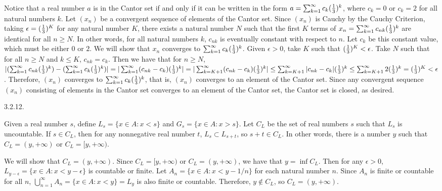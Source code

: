 Notice that a real number $a$ is in the Cantor set
if and only if it can be written in the form
$a = \sum _{k=1} ^\infty c_k ({1 \over 3})^k$,
where $c_k = 0$ or $c_k = 2$ for all natural numbers $k$.
Let $(x_n)$ be a convergent sequence of elements of the Cantor set.
Since $(x_n)$ is Cauchy by the Cauchy Criterion,
taking $\epsilon = ({1 \over 3})^K$ for any natural number $K$,
there exists a natural number $N$ such that the first $K$ terms of
$x_n = \sum _{k=1} ^\infty c_{nk} ({1 \over 3})^k$
are identical for all $n \ge N$.
In other words, for all natural numbers $k$, $c_{nk}$
is eventually constant with respect to $n$.
Let $c_k$ be this constant value, which must be either $0$ or $2$.
We will show that $x_n$ converges to $\sum _{k=1} ^\infty c_k ({1 \over 3})^k$.
Given $\epsilon > 0$, take $K$ such that $({1 \over 3})^K < \epsilon$.
Take $N$ such that for all $n \ge N$ and $k \le K$, $c_{nk} = c_k$.
Then we have that for $n \ge N$,
$\vert(\sum _{k=1} ^\infty c_{nk} ({1 \over 3})^k) -
(\sum _{k=1} ^\infty c_k ({1 \over 3})^k)\vert =
\vert\sum _{k=1} ^\infty (c_{nk} - c_k) ({1 \over 3})^k\vert =
\vert\sum _{k=K+1} ^\infty (c_{nk} - c_k) ({1 \over 3})^k\vert \le
\sum _{k=K+1} ^\infty \vert c_{nk} - c_k\vert ({1 \over 3})^k \le
\sum _{k=K+1} ^\infty 2 ({1 \over 3})^k = ({1 \over 3})^K < \epsilon$.
Therefore, $(x_n)$ converges to $\sum _{k=1} ^\infty c_k ({1 \over 3})^k$,
that is, $(x_n)$ converges to an element of the Cantor set.
Since any convergent sequence $(x_n)$ consisting of elements in the Cantor set
converges to an element of the Cantor set, the Cantor set is closed, as desired.
\bigskip
\item{3.2.12.}

Given a real number $s$, define $L_s = \{x \in A : x < s\}$
and $G_s = \{x \in A : x > s\}$.
Let $C_L$ be the set of real numbers $s$ such that $L_s$ is uncountable.
If $s \in C_L$, then for any nonnegative real number $t$,
$L_s \subset L_{s + t}$, so $s + t \in C_L$.
In other words, there is a number $y$ such that
$C_L = (y, +\infty)$ or $C_L = [y, +\infty)$.

We will show that $C_L = (y, +\infty)$.
Since $C_L = [y, +\infty)$ or $C_L = (y, +\infty)$,
we have that $y = \inf C_L$.
Then for any $\epsilon > 0$,
$L_{y - \epsilon} = \{x \in A : x < y - \epsilon\}$ is countable or finite.
Let $A_n = \{x \in A : x < y - 1/n\}$ for each natural number $n$.
Since $A_n$ is finite or countable for all $n$,
$\bigcup _{n=1} ^\infty A_n = \{x \in A : x < y\} = L_y$
is also finite or countable.
Therefore, $y \notin C_L$, so $C_L = (y, +\infty)$.

